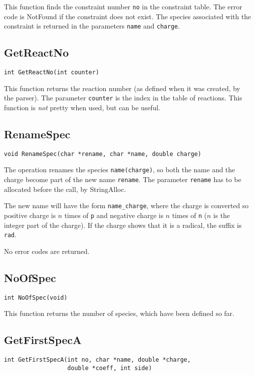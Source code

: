 This function finds the constraint number {\tt no} in the constraint
table. The error code is NotFound if the constraint does not exist.
The species associated with the constraint is returned in the
parameters {\tt name} and {\tt charge}.

\subsection{GetReactNo}
\begin{verbatim}
int GetReactNo(int counter)
\end{verbatim}

This function returns the reaction number (as defined when it was 
created, \eg by the parser). The parameter {\tt counter} is the index
in the table of  
reactions. This function is {\em not} pretty when used, but can be useful.

\subsection{RenameSpec}
\begin{verbatim}
void RenameSpec(char *rename, char *name, double charge) 
\end{verbatim}

The operation renames the species {\tt name(charge)}, so both the name 
and the charge become part of the new name {\tt rename}. The parameter
{\tt rename} has to be allocated before the call, 
\eg by StringAlloc.

The new name will have the form {\tt name\_charge}, where the 
charge is converted so positive charge is $n$ times of {\tt p} and 
negative charge is $n$ times of {\tt n} ($n$ is the integer part
of the charge). If the charge shows that it is a radical, the 
suffix is {\tt rad}.

No error codes are returned.

\subsection{NoOfSpec}
\label{nospec}
\begin{verbatim}
int NoOfSpec(void)
\end{verbatim}

This function returns the number of species, which have been defined so far.

\subsection{GetFirstSpecA}
\label{GetA}
\begin{verbatim}
int GetFirstSpecA(int no, char *name, double *charge, 
                  double *coeff, int side)
\end{verbatim}


